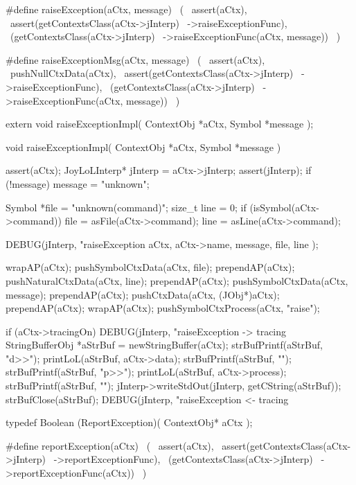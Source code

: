 #define raiseException(aCtx, message)       \
  (                                         \
    assert(aCtx),                           \
    assert(getContextsClass(aCtx->jInterp)  \
      ->raiseExceptionFunc),                \
    (getContextsClass(aCtx->jInterp)        \
      ->raiseExceptionFunc(aCtx, message))  \
  )

#define raiseExceptionMsg(aCtx, message)    \
  (                                         \
    assert(aCtx),                           \
    pushNullCtxData(aCtx),                  \
    assert(getContextsClass(aCtx->jInterp)  \
      ->raiseExceptionFunc),                \
    (getContextsClass(aCtx->jInterp)        \
      ->raiseExceptionFunc(aCtx, message))  \
  )
\stopCHeader

\setCHeaderStream{private}
\startCHeader
extern void raiseExceptionImpl(
  ContextObj *aCtx,
  Symbol     *message
);
\stopCHeader
\setCHeaderStream{public}

\startCCode
void raiseExceptionImpl(
  ContextObj *aCtx,
  Symbol     *message
) {
  assert(aCtx);
  JoyLoLInterp* jInterp = aCtx->jInterp;
  assert(jInterp);
  if (!message) message = "unknown";

  Symbol *file = "unknown(command)";
  size_t  line = 0;
  if (isSymbol(aCtx->command)) {
    file = asFile(aCtx->command);
    line = asLine(aCtx->command);
  }

  DEBUG(jInterp, "raiseException %
    aCtx, aCtx->name, message, file, line
  );

  wrapAP(aCtx);
  pushSymbolCtxData(aCtx, file);
  prependAP(aCtx);
  pushNaturalCtxData(aCtx, line);
  prependAP(aCtx);
  pushSymbolCtxData(aCtx, message);
  prependAP(aCtx);
  pushCtxData(aCtx, (JObj*)aCtx);
  prependAP(aCtx);
  wrapAP(aCtx);
  pushSymbolCtxProcess(aCtx, "raise");
  
  if (aCtx->tracingOn) {
    DEBUG(jInterp, "raiseException -> tracing%
    StringBufferObj *aStrBuf = newStringBuffer(aCtx);
    strBufPrintf(aStrBuf, "d>>");
    printLoL(aStrBuf, aCtx->data);
    strBufPrintf(aStrBuf, "\n");
    strBufPrintf(aStrBuf, "p>>");
    printLoL(aStrBuf, aCtx->process);
    strBufPrintf(aStrBuf, "\n");
    jInterp->writeStdOut(jInterp, getCString(aStrBuf));
    strBufClose(aStrBuf);
    DEBUG(jInterp, "raiseException <- tracing%
  }
}
\stopCCode

\startCHeader
typedef Boolean (ReportException)(
  ContextObj* aCtx
);

#define reportException(aCtx)               \
  (                                         \
    assert(aCtx),                           \
    assert(getContextsClass(aCtx->jInterp)  \
      ->reportExceptionFunc),               \
    (getContextsClass(aCtx->jInterp)        \
      ->reportExceptionFunc(aCtx))          \
  )
\stopCHeader


